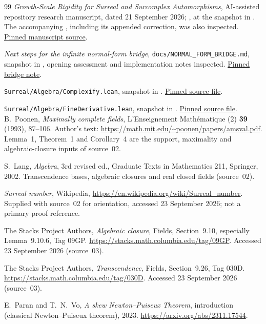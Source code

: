 \documentclass[11pt]{article}
\theoremstyle{definition}
\theoremstyle{remark}
\numberwithin{equation}{section}
\begin{document}
\begin{thebibliography}{99}
\emph{Growth-Scale Rigidity for Surreal and Surcomplex Automorphisms},
AI-assisted repository research manuscript, dated 21 September 2026;
,
at the snapshot in \cite{Repo}.
The accompanying , including
its appended correction, was also inspected.
\href{https://github.com/VladimirReshetnikov/Surreal/blob/dcf86662b574988e75d08d515d3a2a5ba7bbc0d7/docs/surreal/exponential-automorphism-rigidity/article.tex}{Pinned manuscript source}.

\emph{Next steps for the infinite normal-form bridge},
\texttt{docs/NORMAL\_FORM\_BRIDGE.md}, snapshot in \cite{Repo},
opening assessment and implementation notes inspected.
\href{https://github.com/VladimirReshetnikov/Surreal/blob/dcf86662b574988e75d08d515d3a2a5ba7bbc0d7/docs/NORMAL_FORM_BRIDGE.md}{Pinned bridge note}.

\nolinkurl{Surreal/Algebra/Complexify.lean}, snapshot in \cite{Repo}.
\href{https://github.com/VladimirReshetnikov/Surreal/blob/dcf86662b574988e75d08d515d3a2a5ba7bbc0d7/Surreal/Algebra/Complexify.lean}{Pinned source file}.

\nolinkurl{Surreal/Algebra/FineDerivative.lean}, snapshot in \cite{Repo}.
\href{https://github.com/VladimirReshetnikov/Surreal/blob/dcf86662b574988e75d08d515d3a2a5ba7bbc0d7/Surreal/Algebra/FineDerivative.lean}{Pinned source file}.
B.~Poonen,
\emph{Maximally complete fields},
L'Enseignement Math\'ematique (2) \textbf{39} (1993), 87--106.
Author's text: \url{https://math.mit.edu/~poonen/papers/amsval.pdf}.
Lemma~1, Theorem~1 and Corollary~4 are the support, maximality and
algebraic-closure inputs of source~02.

S.~Lang,
\emph{Algebra}, 3rd revised ed., Graduate Texts in Mathematics 211,
Springer, 2002. Transcendence bases, algebraic closures and real closed fields
(source~02).

\emph{Surreal number}, Wikipedia,
\url{https://en.wikipedia.org/wiki/Surreal_number}.
Supplied with source~02 for orientation, accessed 23 September 2026; not a
primary proof reference.

The Stacks Project Authors,
\emph{Algebraic closure}, Fields, Section~9.10, especially Lemma~9.10.6, Tag 09GP.
\url{https://stacks.math.columbia.edu/tag/09GP}.
Accessed 23 September 2026 (source~03).

The Stacks Project Authors,
\emph{Transcendence}, Fields, Section~9.26, Tag 030D.
\url{https://stacks.math.columbia.edu/tag/030D}.
Accessed 23 September 2026 (source~03).

E.~Paran and T.~N.~Vo,
\emph{A skew Newton--Puiseux Theorem}, introduction (classical
Newton--Puiseux theorem), 2023.
\url{https://arxiv.org/abs/2311.17544}.
\end{thebibliography}
\end{document}
